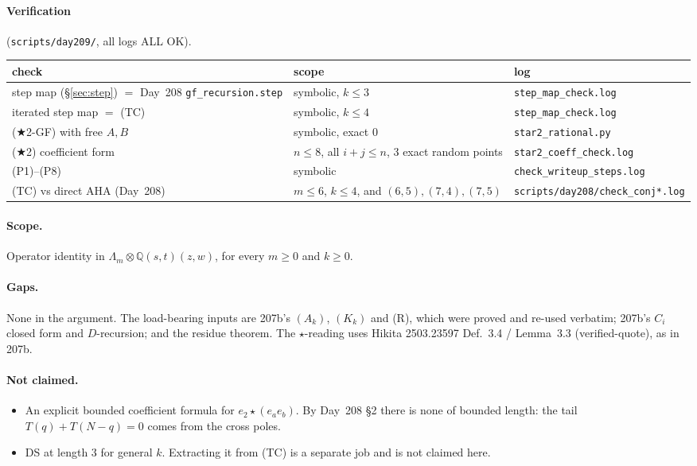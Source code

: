 \documentclass[11pt]{amsart}
\theoremstyle{remark}
\begin{document}
\paragraph{Verification} (\texttt{scripts/day209/}, all logs ALL OK).

\begin{center}
\footnotesize
\begin{tabular}{@{}p{}p{}p{}@{}}
\toprule
check & scope & log\\
\midrule
step map (\S\ref{sec:step}) $=$ Day~208 \texttt{gf\_recursion.step} & symbolic, $k\le3$ & \texttt{step\_map\_check.log}\\
iterated step map $=$ (TC) & symbolic, $k\le4$ & \texttt{step\_map\_check.log}\\
($\bigstar$2-GF) with free $A,B$ & symbolic, exact $0$ & \texttt{star2\_rational.py}\\
($\bigstar$2) coefficient form & $n\le8$, all $i+j\le n$, 3 exact random points & \texttt{star2\_coeff\_check.log}\\
(P1)--(P8) & symbolic & \texttt{check\_writeup\_steps.log}\\
(TC) vs direct AHA (Day~208) & $m\le6$, $k\le4$, and $(6,5),(7,4),(7,5)$ & \texttt{scripts/day208/}\allowbreak\texttt{check\_conj*.log}\\
\bottomrule
\end{tabular}
\end{center}

\paragraph{Scope.} Operator identity in $\Lambda_m\otimes\mathbb{Q}(s,t)(z,w)$, for every $m\ge0$ and $k\ge0$.

\paragraph{Gaps.} None in the argument. The load-bearing inputs are 207b's $(A_k)$, $(K_k)$ and (R), which were proved and re-used verbatim; 207b's $C_i$ closed form and $D$-recursion; and the residue theorem. The $\star$-reading uses Hikita 2503.23597 Def.~3.4 / Lemma~3.3 (verified-quote), as in 207b.

\paragraph{Not claimed.}
\begin{itemize}
\item An explicit bounded coefficient formula for $e_2\star(e_ae_b)$. By Day~208 \S2 there is none of bounded length: the tail $T(q)+T(N-q)=0$ comes from the cross poles.
\item DS at length 3 for general $k$. Extracting it from (TC) is a separate job and is not claimed here.
\end{itemize}
\end{document}
